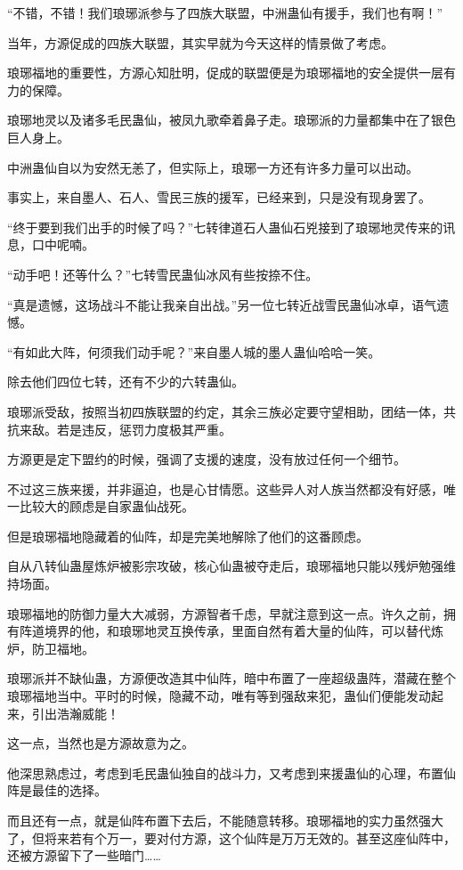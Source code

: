 \begin{this_body}
“不错，不错！我们琅琊派参与了四族大联盟，中洲蛊仙有援手，我们也有啊！”

当年，方源促成的四族大联盟，其实早就为今天这样的情景做了考虑。

琅琊福地的重要性，方源心知肚明，促成的联盟便是为琅琊福地的安全提供一层有力的保障。

琅琊地灵以及诸多毛民蛊仙，被凤九歌牵着鼻子走。琅琊派的力量都集中在了银色巨人身上。

中洲蛊仙自以为安然无恙了，但实际上，琅琊一方还有许多力量可以出动。

事实上，来自墨人、石人、雪民三族的援军，已经来到，只是没有现身罢了。

“终于要到我们出手的时候了吗？”七转律道石人蛊仙石兇接到了琅琊地灵传来的讯息，口中呢喃。

“动手吧！还等什么？”七转雪民蛊仙冰风有些按捺不住。

“真是遗憾，这场战斗不能让我亲自出战。”另一位七转近战雪民蛊仙冰卓，语气遗憾。

“有如此大阵，何须我们动手呢？”来自墨人城的墨人蛊仙哈哈一笑。

除去他们四位七转，还有不少的六转蛊仙。

琅琊派受敌，按照当初四族联盟的约定，其余三族必定要守望相助，团结一体，共抗来敌。若是违反，惩罚力度极其严重。

方源更是定下盟约的时候，强调了支援的速度，没有放过任何一个细节。

不过这三族来援，并非逼迫，也是心甘情愿。这些异人对人族当然都没有好感，唯一比较大的顾虑是自家蛊仙战死。

但是琅琊福地隐藏着的仙阵，却是完美地解除了他们的这番顾虑。

自从八转仙蛊屋炼炉被影宗攻破，核心仙蛊被夺走后，琅琊福地只能以残炉勉强维持场面。

琅琊福地的防御力量大大减弱，方源智者千虑，早就注意到这一点。许久之前，拥有阵道境界的他，和琅琊地灵互换传承，里面自然有着大量的仙阵，可以替代炼炉，防卫福地。

琅琊派并不缺仙蛊，方源便改造其中仙阵，暗中布置了一座超级蛊阵，潜藏在整个琅琊福地当中。平时的时候，隐藏不动，唯有等到强敌来犯，蛊仙们便能发动起来，引出浩瀚威能！

这一点，当然也是方源故意为之。

他深思熟虑过，考虑到毛民蛊仙独自的战斗力，又考虑到来援蛊仙的心理，布置仙阵是最佳的选择。

而且还有一点，就是仙阵布置下去后，不能随意转移。琅琊福地的实力虽然强大了，但将来若有个万一，要对付方源，这个仙阵是万万无效的。甚至这座仙阵中，还被方源留下了一些暗门……


\end{this_body}
